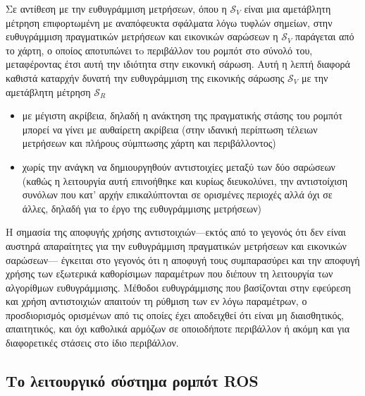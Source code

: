 \begin{bw_box}
\begin{remark}
Σε αντίθεση με την ευθυγράμμιση μετρήσεων, όπου η $\mathcal{S}_V$ είναι μια
αμετάβλητη μέτρηση επιφορτωμένη με αναπόφευκτα σφάλματα λόγω τυφλών σημείων,
στην ευθυγράμμιση πραγματικών μετρήσεων και εικονικών σαρώσεων η
$\mathcal{S}_V$ παράγεται από το χάρτη, ο οποίος αποτυπώνει τo περιβάλλον του
ρομπότ στο σύνολό του, μεταφέροντας έτσι αυτή την ιδιότητα στην εικονική
σάρωση. Αυτή η λεπτή διαφορά καθιστά καταρχήν δυνατή την ευθυγράμμιση της
εικονικής σάρωσης $\mathcal{S}_V$ με την αμετάβλητη μέτρηση $\mathcal{S}_R$
\begin{itemize}
  \item με μέγιστη ακρίβεια, δηλαδή η ανάκτηση της πραγματικής στάσης του ρομπότ
        μπορεί να γίνει με αυθαίρετη ακρίβεια (στην ιδανική περίπτωση τέλειων
        μετρήσεων και πλήρους σύμπτωσης χάρτη και περιβάλλοντος)
  \item χωρίς την ανάγκη να δημιουργηθούν αντιστοιχίες μεταξύ των δύο
        σαρώσεων (καθώς η λειτουργία αυτή επινοήθηκε και κυρίως διευκολύνει,
        την αντιστοίχιση συνόλων που κατ' αρχήν επικαλύπτονται σε ορισμένες
        περιοχές αλλά όχι σε άλλες, δηλαδή για το έργο της ευθυγράμμισης
        μετρήσεων)
\end{itemize}
\end{remark}
\end{bw_box}

\begin{bw_box}
\begin{remark}
Η σημασία της αποφυγής χρήσης αντιστοιχιών---εκτός από το γεγονός ότι δεν είναι
αυστηρά απαραίτητες για την ευθυγράμμιση πραγματικών μετρήσεων και εικονικών
σαρώσεων--- έγκειται στο γεγονός ότι η αποφυγή τους συμπαρασύρει και την
αποφυγή χρήσης των εξωτερικά καθορίσιμων παραμέτρων που διέπουν τη λειτουργία των
αλγορίθμων ευθυγράμμισης. Μέθοδοι ευθυγράμμισης που βασίζονται στην εφεύρεση
και χρήση αντιστοιχιών απαιτούν τη ρύθμιση των εν λόγω παραμέτρων, ο
προσδιορισμός ορισμένων από τις οποίες έχει αποδειχθεί ότι είναι μη
διαισθητικός, απαιτητικός, και όχι καθολικά αρμόζων σε οποιοδήποτε
περιβάλλον ή ακόμη και για διαφορετικές στάσεις στο ίδιο περιβάλλον.
\end{remark}
\end{bw_box}


\subsection{Το λειτουργικό σύστημα ρομπότ ROS}
